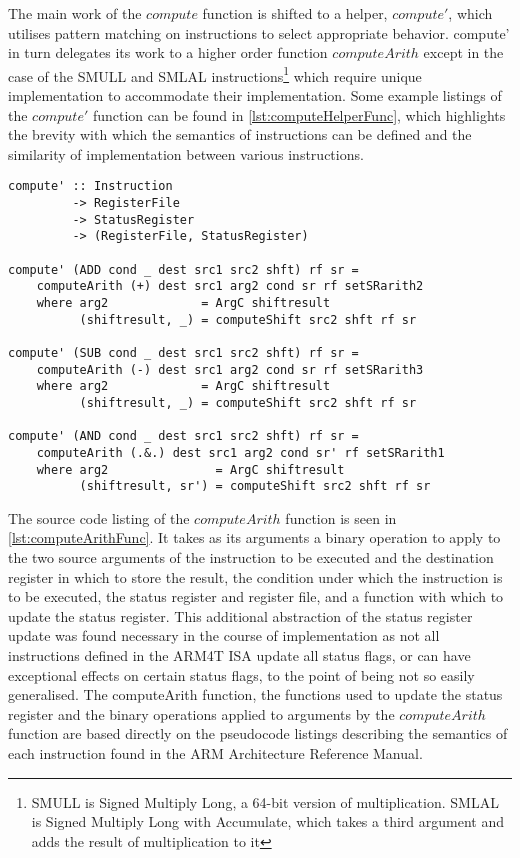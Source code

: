 The main work of the $compute$ function is shifted to a helper, $compute'$, which utilises pattern matching on instructions to select appropriate behavior. compute' in turn delegates its work to a higher order function $computeArith$ except in the case of the SMULL and SMLAL instructions\footnote{SMULL is Signed Multiply Long, a 64-bit version of multiplication. SMLAL is Signed Multiply Long with Accumulate, which takes a third argument and adds the result of multiplication to it} which require unique implementation to accommodate their implementation. Some example listings of the $compute'$ function can be found in \autoref{lst:computeHelperFunc}, which highlights the brevity with which the semantics of instructions can be defined and the similarity of implementation between various instructions.

\begin{lstlisting}[mathescape,numbers=none,caption={The $compute'$ helper function for ADD, SUB and AND},label={lst:computeHelperFunc}]
compute' :: Instruction
         -> RegisterFile
         -> StatusRegister
         -> (RegisterFile, StatusRegister)

compute' (ADD cond _ dest src1 src2 shft) rf sr =
    computeArith (+) dest src1 arg2 cond sr rf setSRarith2
    where arg2             = ArgC shiftresult
          (shiftresult, _) = computeShift src2 shft rf sr

compute' (SUB cond _ dest src1 src2 shft) rf sr =
    computeArith (-) dest src1 arg2 cond sr rf setSRarith3
    where arg2             = ArgC shiftresult
          (shiftresult, _) = computeShift src2 shft rf sr

compute' (AND cond _ dest src1 src2 shft) rf sr =
    computeArith (.&.) dest src1 arg2 cond sr' rf setSRarith1
    where arg2               = ArgC shiftresult
          (shiftresult, sr') = computeShift src2 shft rf sr
\end{lstlisting}

The source code listing of the $computeArith$ function is seen in \autoref{lst:computeArithFunc}. It takes as its arguments a binary operation to apply to the two source arguments of the instruction to be executed and the destination register in which to store the result, the condition under which the instruction is to be executed, the status register and register file, and a function with which to update the status register. This additional abstraction of the status register update was found necessary in the course of implementation as not all instructions defined in the ARM4T ISA update all status flags, or can have exceptional effects on certain status flags, to the point of being not so easily generalised. The computeArith function, the functions used to update the status register and the binary operations applied to arguments by the $computeArith$ function are based directly on the pseudocode listings describing the semantics of each instruction found in the ARM Architecture Reference Manual.

